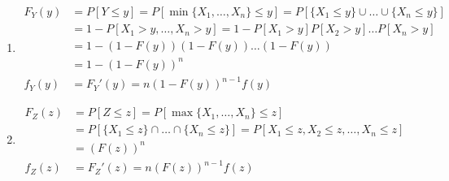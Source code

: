 \documentclass{article}
\begin{document}
\begin{enumerate}
\begin{enumerate}
\item
\begin{align*}
F_Y(y) &= P[Y \leq y]
= P[\min\{X_1, \dots , X_n\} \leq y] 
= P[\{X_1 \leq y\} \cup \dots \cup \{X_n \leq y\}] \\
&= 1- P[X_1 > y, \dots , X_n > y]
= 1- P[X_1 > y] P[X_2 > y] \dots  P[X_n > y] \\
&= 1- (1-F(y))(1-F(y))\dots (1-F(y)) \\
&= \boxed{1 - (1-F(y))^n} \\
f_Y(y) &= F_Y'(y)  = \boxed{n(1-F(y))^{n-1}f(y)}
\end{align*}
\item
\begin{align*}
F_Z(z) &= P[Z \leq z] = P[\max\{X_1, \dots , X_n\} \leq z]\\
&= P[\{X_1 \leq z\} \cap \dots \cap \{X_n \leq z\}]
= P[X_1 \leq z, X_2 \leq z, \dots , X_n \leq z]\\
&= \boxed{(F(z))^n}\\
f_Z(z) &= F_Z'(z) = \boxed{n(F(z))^{n-1}f(z)}
\end{align*}
\end{enumerate}

\end{enumerate}
\end{document}

